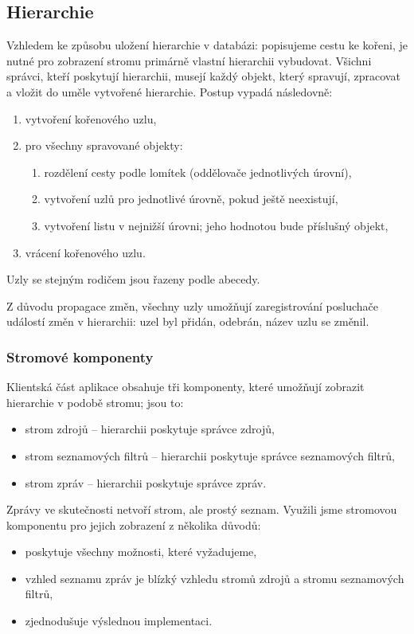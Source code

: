 \subsection{Hierarchie}

Vzhledem ke způsobu uložení hierarchie v databázi: popisujeme cestu ke kořeni, je nutné pro zobrazení stromu primárně vlastní hierarchii vybudovat.
Všichni správci, kteří poskytují hierarchii, musejí každý objekt, který spravují, zpracovat a vložit do uměle vytvořené hierarchie.
Postup vypadá následovně:
\begin{enumerate}
	\item vytvoření kořenového uzlu,
	\item pro všechny spravované objekty:
		\begin{enumerate}[label*=\arabic*.]
			\item rozdělení cesty podle lomítek (oddělovače jednotlivých úrovní),
			\item vytvoření uzlů pro jednotlivé úrovně, pokud ještě neexistují,
			\item vytvoření listu v nejnižší úrovni; jeho hodnotou bude příslušný objekt,
		\end{enumerate}
	\item vrácení kořenového uzlu.
\end{enumerate}

Uzly se stejným rodičem jsou řazeny podle abecedy.

Z důvodu propagace změn, všechny uzly umožňují zaregistrování posluchače událostí změn v hierarchii: uzel byl přidán, odebrán, název uzlu se změnil.

\subsubsection{Stromové komponenty}

Klientská část aplikace obsahuje tři komponenty, které umožňují zobrazit hierarchie v podobě stromu; jsou to:
\begin{itemize}
	\item strom zdrojů -- hierarchii poskytuje správce zdrojů,
	\item strom seznamových filtrů -- hierarchii poskytuje správce seznamových filtrů,
	\item strom zpráv -- hierarchii poskytuje správce zpráv.
\end{itemize}

Zprávy ve skutečnosti netvoří strom, ale prostý seznam.
Využili jsme stromovou komponentu pro jejich zobrazení z několika důvodů:
\begin{itemize}
	\item poskytuje všechny možnosti, které vyžadujeme,
	\item vzhled seznamu zpráv je blízký vzhledu stromů zdrojů a stromu seznamových filtrů,
	\item zjednodušuje výslednou implementaci.
\end{itemize}

